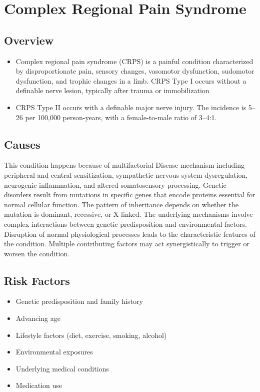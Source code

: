 \chapter{Complex Regional Pain Syndrome}
\label{sec:Complex Regional Pain Syndrome}

\section{Overview}


\begin{itemize}[noitemsep]
  \item Complex regional pain syndrome (CRPS) is a painful condition characterized by disproportionate pain, sensory changes, vasomotor dysfunction, sudomotor dysfunction, and trophic changes in a limb. CRPS Type I occurs without a definable nerve lesion, typically after trauma or immobilization
  \item CRPS Type II occurs with a definable major nerve injury. The incidence is 5--26 per 100,000 person-years, with a female-to-male ratio of 3--4:1.
\end{itemize}
\section{Causes}
This condition happens because of multifactorial Disease mechanism including peripheral and central sensitization, sympathetic nervous system dysregulation, neurogenic inflammation, and altered somatosensory processing. Genetic disorders result from mutations in specific genes that encode proteins essential for normal cellular function. The pattern of inheritance depends on whether the mutation is dominant, recessive, or X-linked. The underlying mechanisms involve complex interactions between genetic predisposition and environmental factors. Disruption of normal physiological processes leads to the characteristic features of the condition. Multiple contributing factors may act synergistically to trigger or worsen the condition.
\section{Risk Factors}


\begin{itemize}[noitemsep]
  \item Genetic predisposition and family history
  \item Advancing age
  \item Lifestyle factors (diet, exercise, smoking, alcohol)
  \item Environmental exposures
  \item Underlying medical conditions
  \item Medication use
\end{itemize}
